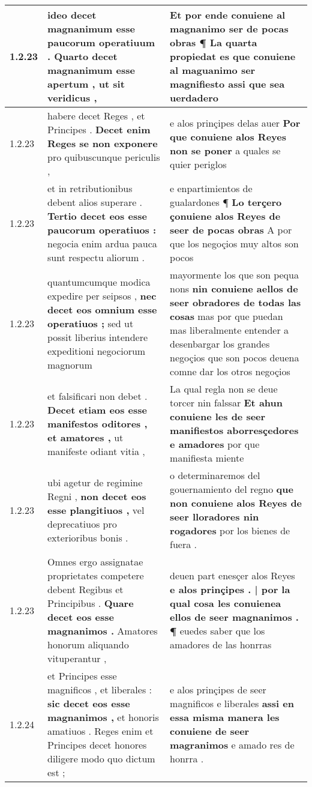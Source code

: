 \begin{tabular}{|p{1cm}|p{6.5cm}|p{6.5cm}|}
1.2.23 & ideo decet magnanimum esse paucorum operatiuum . \textbf{ Quarto decet magnanimum esse apertum , } ut sit veridicus , & Et por ende conuiene al magnanimo ser de pocas obras ¶ \textbf{ La quarta propiedat es que conuiene al maguanimo ser magnifiesto } assi que sea uerdadero \\\hline
1.2.23 & habere decet Reges , et Principes . \textbf{ Decet enim Reges se non exponere } pro quibuscunque periculis , & e alos prinçipes delas auer \textbf{ Por que conuiene alos Reyes non se poner } a quales se quier periglos \\\hline
1.2.23 & et in retributionibus debent alios superare . \textbf{ Tertio decet eos esse paucorum operatiuos : } negocia enim ardua pauca sunt respectu aliorum . & e enpartimientos de gualardones ¶ \textbf{ Lo terçero çonuiene alos Reyes de seer de pocas obras } A por que los negoçios muy altos son pocos \\\hline
1.2.23 & quantumcumque modica expedire per seipsos , \textbf{ nec decet eos omnium esse operatiuos ; } sed ut possit liberius intendere expeditioni negociorum magnorum & mayormente los que son pequa nons \textbf{ nin conuiene aellos de seer obradores de todas las cosas } mas por que puedan mas liberalmente entender a desenbargar los grandes negoçios que son pocos deuena comne dar los otros negoçios \\\hline
1.2.23 & et falsificari non debet . \textbf{ Decet etiam eos esse manifestos oditores , et amatores , } ut manifeste odiant vitia , & La qual regla non se deue torcer nin falssar \textbf{ Et ahun conuiene les de seer manifiestos aborresçedores e amadores } por que manifiesta miente \\\hline
1.2.23 & ubi agetur de regimine Regni , \textbf{ non decet eos esse plangitiuos , } vel deprecatiuos pro exterioribus bonis . & o determinaremos del gouernamiento del regno \textbf{ que non conuiene alos Reyes de seer lloradores nin rogadores } por los bienes de fuera . \\\hline
1.2.23 & Omnes ergo assignatae proprietates competere debent Regibus et Principibus . \textbf{ Quare decet eos esse magnanimos . } Amatores honorum aliquando vituperantur , & deuen part enesçer alos Reyes \textbf{ e alos prinçipes . | por la qual cosa les conuienea ellos de seer magnanimos . ¶ } euedes saber que los amadores de las honrras \\\hline
1.2.24 & et Principes esse magnificos , et liberales : \textbf{ sic decet eos esse magnanimos , } et honoris amatiuos . Reges enim et Principes decet honores diligere modo quo dictum est ; & e alos prinçipes de seer magnificos e liberales \textbf{ assi en essa misma manera les conuiene de seer magranimos } e amado res de honrra . \\\hline

\end{tabular}
